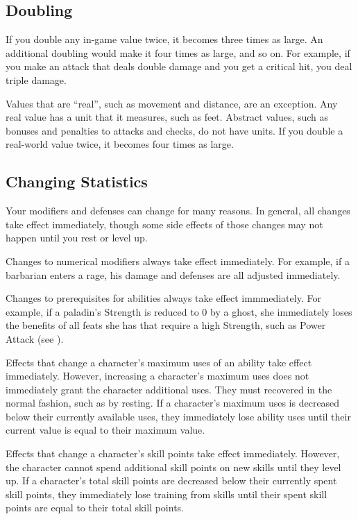     \subsection{Doubling}\label{Doubling}
        If you double any in-game value twice, it becomes three times as large. An additional doubling would make it four times as large, and so on. For example, if you make an attack that deals double damage and you get a critical hit, you deal triple damage.

         Values that are ``real'', such as movement and distance, are an exception.
        Any real value has a unit that it measures, such as feet.
        Abstract values, such as bonuses and penalties to attacks and checks, do not have units.
        If you double a real-world value twice, it becomes four times as large.

    \subsection{Changing Statistics}

        Your modifiers and defenses can change for many reasons.
        In general, all changes take effect immediately, though some side effects of those changes may not happen until you rest or level up.

         Changes to numerical modifiers always take effect immediately.
        For example, if a barbarian enters a rage, his damage and defenses are all adjusted immediately.

         Changes to prerequisites for abilities always take effect immmediately.
        For example, if a paladin's Strength is reduced to 0 by a ghost, she immediately loses the benefits of all feats she has that require a high Strength, such as Power Attack (see ).

         Effects that change a character's maximum uses of an ability take effect immediately.
        However, increasing a character's maximum uses does not immediately grant the character additional uses.
        They must recovered in the normal fashion, such as by resting.
        If a character's maximum uses is decreased below their currently available uses, they immediately lose ability uses until their current value is equal to their maximum value.

         Effects that change a character's skill points take effect immediately.
        However, the character cannot spend additional skill points on new skills until they level up.
        If a character's total skill points are decreased below their currently spent skill points, they immediately lose training from skills until their spent skill points are equal to their total skill points.

